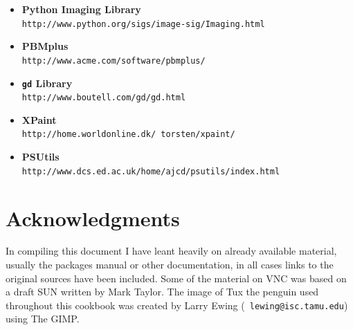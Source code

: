 \documentclass[twoside,11pt]{article}
\newcommand{\htmladdnormallink}[2]{#1}
\newcommand{\htmlref}[2]{#1}
\newcommand{\xlabel}[1]{}
\begin{document}
\begin{itemize}
\item {\bf\label{sc15_available_pythonimg}Python Imaging Library}\\
\htmladdnormallink{{\tt http://www.python.org/sigs/image-sig/Imaging.html}}{http://www.python.org/sigs/image-sig/Imaging.html}

\item {\bf\label{sc15_available_pbmplus}PBMplus}\\
\htmladdnormallink{{\tt http://www.acme.com/software/pbmplus/}}{http://www.acme.com/software/pbmplus/}

\item {\bf\label{sc15_available_gd}{\tt gd} Library}\\
\htmladdnormallink{{\tt http://www.boutell.com/gd/gd.html}}{http://www.boutell.com/gd/gd.html}

\item {\bf\label{sc15_available_xpaint}{XPaint}}\\
\htmladdnormallink{{\tt http://home.worldonline.dk/~torsten/xpaint/}}{http://home.worldonline.dk/~torsten/xpaint/}

\item {\bf\label{sc15_available_psutils}{PSUtils}}\\
\htmladdnormallink{{\tt http://www.dcs.ed.ac.uk/home/ajcd/psutils/index.html}}{http://www.dcs.ed.ac.uk/home/ajcd/psutils/index.html}

\end{itemize}
           
\section*{\xlabel{sc15_acks}Acknowledgments\label{sc15_acks}}

In compiling this document I have leant heavily on already available
material, usually the packages manual or other documentation, in all
cases links to the original sources have been included. Some of the
material on \htmlref{VNC}{sc15_vnc} was based on a draft SUN written
by \htmladdnormallink{Mark Taylor}{http://www.ast.cam.ac.uk/~mbt/}.
The image of \htmladdnormallink{Tux the
penguin}{http://www.woodsoup.org/projs/tux_aqfh/doc/index.html} used
throughout this cookbook was created by Larry Ewing
\htmladdnormallink{({\tt
lewing@isc.tamu.edu})}{mailto:lewing@isc.tamu.edu} using \htmlref{The
GIMP}{sc15_gimp}.
\end{document}
